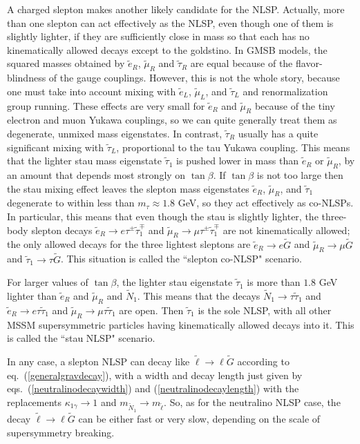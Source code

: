 \documentclass[12pt]{article}
\def\stilde{\widetilde}
\def\G{\stilde G}
\def\NI{\stilde N_1}
\begin{document}
A charged slepton makes another likely candidate for the NLSP. Actually, 
more than one slepton can act effectively as 
the NLSP, even though one of them is slightly lighter, if they are 
sufficiently close in mass so that each has no kinematically allowed 
decays except to the goldstino. In GMSB models, the squared masses 
obtained by $\widetilde e_R$, $\widetilde \mu_R$ and $\widetilde \tau_R$ 
are equal because of the flavor-blindness of the gauge couplings. However, 
this is not the whole story, because one must take into account mixing 
with $\widetilde e_L$, $\widetilde \mu_L$, and $\widetilde \tau_L$ and 
renormalization group running.  These effects are very small for 
$\widetilde e_R$ and $\widetilde \mu_R$ because of the tiny electron and 
muon Yukawa couplings, so we can quite generally treat them as degenerate, 
unmixed mass eigenstates. In contrast, $\widetilde \tau_R$ usually has a 
quite significant mixing with $\widetilde \tau_L$, proportional to the tau 
Yukawa coupling. This means that the lighter stau mass eigenstate 
$\widetilde \tau_1$ is pushed lower in mass than $\widetilde e_R$ or 
$\widetilde \mu_R$, by an amount that depends most strongly on 
$\tan\beta$.  If $\tan\beta$ is not too large then the stau mixing effect 
leaves the slepton mass eigenstates $\widetilde e_R$, $\widetilde \mu_R$, 
and $\widetilde \tau_1$ degenerate to within less than $m_\tau \approx 1.8 
$ GeV, so they act effectively as co-NLSPs.  In particular, this means 
that even though the stau is slightly lighter, the three-body slepton 
decays $\widetilde e_R \rightarrow e\tau^\pm\widetilde \tau_1^\mp$ and 
$\widetilde \mu_R \rightarrow \mu\tau^\pm\widetilde \tau_1^\mp$ are not 
kinematically allowed; the only allowed decays for the three lightest 
sleptons are $\widetilde e_R\rightarrow e \G$ and $\widetilde \mu_R 
\rightarrow \mu\G$ and $\widetilde \tau_1 \rightarrow \tau \G$. This 
situation is called the ``slepton co-NLSP" scenario.

For larger values of $\tan\beta$, the lighter stau eigenstate $\stilde 
\tau_1$ is more than $1.8$ GeV lighter than $\widetilde e_R$ and 
$\widetilde \mu_R$ and $\NI$.  This means that the decays $\NI \rightarrow 
\tau\stilde \tau_1$ and $\widetilde e_R \rightarrow e \tau \stilde \tau_1$ 
and $\widetilde \mu_R \rightarrow \mu \tau \stilde\tau_1$ are open. Then 
$\widetilde \tau_1$ is the sole NLSP, with all other MSSM supersymmetric 
particles having kinematically allowed decays into it. This is called the 
``stau NLSP" scenario.

In any case, a slepton NLSP can decay like $\stilde \ell \rightarrow \ell 
\G$ according to eq.~(\ref{generalgravdecay}), with a width and decay 
length just given by eqs.~(\ref{neutralinodecaywidth}) and 
(\ref{neutralinodecaylength}) with the replacements $\kappa_{1\gamma} 
\rightarrow 1$ and $m_{\stilde N_1} \rightarrow m_{\stilde \ell}$. So, as 
for the neutralino NLSP case, the decay $\stilde \ell \rightarrow \ell\G$ 
can be either fast or very slow, depending on the scale of supersymmetry 
breaking.
\end{document}

